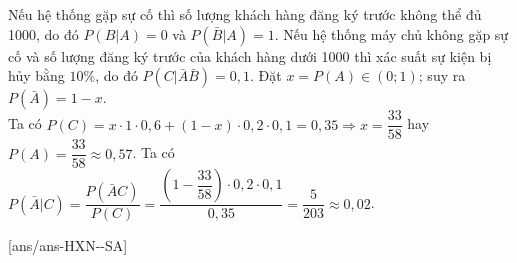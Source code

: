 \begin{ex}
{\begin{center}
     \end{center}
     \begin{itemchoice}
         \itemch Nếu hệ thống gặp sự cố thì số lượng khách hàng đăng ký trước không thể đủ 1000, do đó  $P\left(B|A\right)=0$ và $P\left(\bar{B}|A\right)=1$.
         \itemch Nếu hệ thống máy chủ không gặp sự cố và số lượng đăng ký trước của khách hàng dưới 1000 thì xác suất sự kiện bị hủy bằng $10\%$, do đó $P\left(C|\bar{A}\bar{B}\right)=0{,}1$.
         \itemch Đặt $x=P(A)\in (0;1)$; suy ra $P\left({\bar{A}}\right)=1-x$.\\
         Ta có $P(C)=x\cdot 1\cdot 0{,}6+(1-x)\cdot 0{,}2\cdot 0{,}1=0{,}35\Rightarrow x=\dfrac{33}{58}$ hay $P(A)=\dfrac{33}{58}\approx 0{,}57$.
         \itemch Ta có $P\left(\bar{A}|C\right)=\dfrac{P\left(\bar{A}C\right)}{P(C)}=\dfrac{\left(1-\dfrac{33}{58}\right)\cdot 0{,}2\cdot 0{,}1}{0{,}35}=\dfrac{5}{203}\approx 0{,}02$.
     \end{itemchoice}
 }
\end{ex}
\caukq
{}[ans/ans-HXN-\sode-SA]
